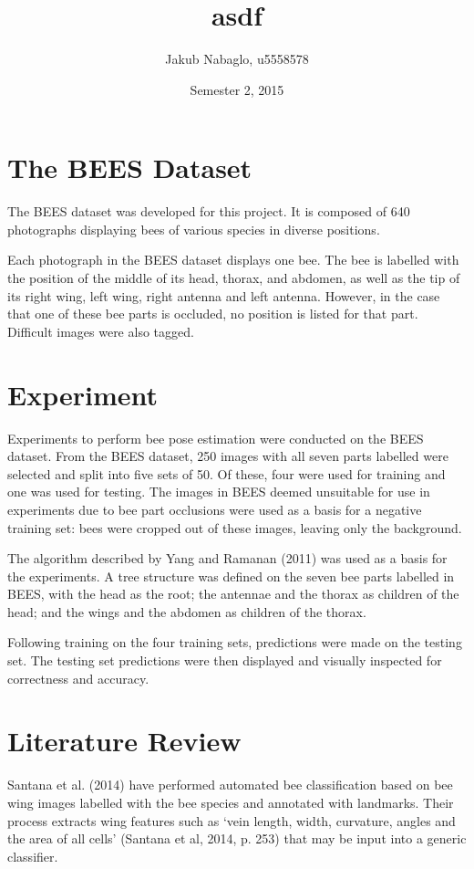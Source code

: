 \documentclass[11pt, oneside]{article}
\title{asdf}
\author{Jakub Nabaglo, u5558578}
\date{Semester 2, 2015}
\begin{document}
\maketitle

\section{The BEES Dataset}
The BEES dataset was developed for this project. It is composed of 640
photographs displaying bees of various species in diverse positions.

Each photograph in the BEES dataset displays one bee. The bee is labelled with
the position of the middle of its head, thorax, and abdomen, as well as the
tip of its right wing, left wing, right antenna and left antenna. However, in
the case that one of these bee parts is occluded, no position is listed for
that part. Difficult images were also tagged.

\section{Experiment}
Experiments to perform bee pose estimation were conducted on the BEES dataset.
From the BEES dataset, 250 images with all seven parts labelled were selected
and split into five sets of 50. Of these, four were used for training and one
was used for testing. The images in BEES deemed unsuitable for use in
experiments due to bee part occlusions were used as a basis for a negative
training set: bees were cropped out of these images, leaving only the
background.

The algorithm described by Yang and Ramanan (2011) was used as a basis for the
experiments. A tree structure was defined on the seven bee parts labelled in
BEES, with the head as the root; the antennae and the thorax as children of
the head; and the wings and the abdomen as children of the thorax.

Following training on the four training sets, predictions were made on the
testing set. The testing set predictions were then displayed and visually
inspected for correctness and accuracy.

\section{Literature Review}

Santana et al. (2014) have performed automated bee classification based on
bee wing images labelled with the bee species and annotated with landmarks.
Their process extracts wing features such as `vein length, width, curvature,
angles and the area of all cells' (Santana et al, 2014, p. 253) that may be
input into a generic classifier.
\end{document}
